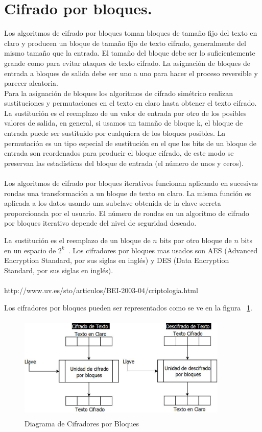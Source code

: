 \section{Cifrado por bloques. }
Los algoritmos de cifrado por bloques toman bloques de tamaño fijo del texto en claro y producen un bloque de tamaño fijo de texto cifrado, generalmente del mismo tamaño que la entrada. El tamaño del bloque debe ser lo suficientemente grande como para evitar ataques de texto cifrado. La asignación de bloques de entrada a bloques de salida debe ser uno a uno para hacer el proceso reversible y parecer aleatoria.\\ 
Para la asignación de bloques los algoritmos de cifrado simétrico realizan sustituciones y permutaciones en el texto en claro hasta obtener el texto cifrado.\\ 
La sustitución es el reemplazo de un valor de entrada por otro de los posibles valores de salida, en general, si usamos un tamaño de bloque k, el bloque de entrada puede ser sustituido por cualquiera de los bloques posibles.
La permutación es un tipo especial de sustitución en el que los bits de un bloque de entrada son reordenados para producir el bloque cifrado, de este modo se preservan las estadísticas del bloque de entrada (el número de unos y ceros). \\ \\  Los algoritmos de cifrado por bloques iterativos funcionan aplicando en sucesivas rondas una transformación a un bloque de texto en claro. La misma función es aplicada a los datos usando una subclave obtenida de la clave secreta proporcionada por el usuario. El número de rondas en un algoritmo de cifrado por bloques iterativo depende del nivel de seguridad deseado.

La sustitución es el reemplazo de un bloque de $n$ bits por otro bloque de $n$ bits en un espacio de 
$2^{k}$~\cite{bloc}. Los cifradores por bloques mas usados son AES (Advanced Encryption Standard, por sus 
siglas en ingl\'es) y DES (Data Encryption Standard, por sus siglas en ingl\'es). \\ \\ 

http://www.uv.es/sto/articulos/BEI-2003-04/criptologia.html

Los cifradores por bloques pueden ser representados como se ve en la figura ~\ref{fig:1-2-5}.

\begin{figure}[H]
\centering
	\includegraphics[width=10cm, height=5cm]{./images/CifradoBloques.jpeg}
	\caption{Diagrama de Cifradores por Bloques}
	\label{fig:1-2-5}
\end{figure}



